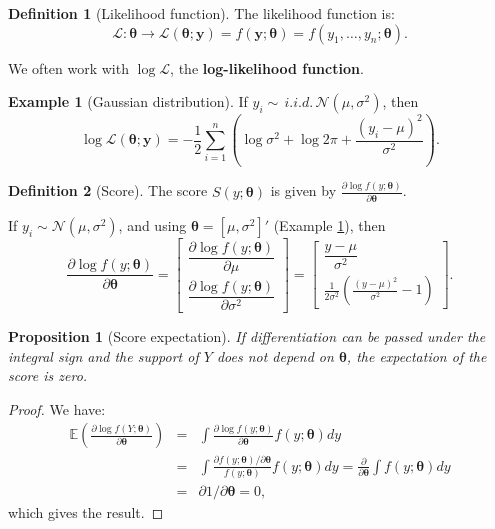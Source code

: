\documentclass[
  11pt,
]{book}
\newtheorem{proposition}{Proposition}[chapter]
\theoremstyle{definition}
\newtheorem{definition}{Definition}[chapter]
\theoremstyle{definition}
\newtheorem{example}{Example}[chapter]
\theoremstyle{definition}
\theoremstyle{definition}
\theoremstyle{remark}
\begin{document}
\begin{definition}[Likelihood function]
\protect\hypertarget{def:likelihood}{}\label{def:likelihood}The likelihood function is:
\[
\mathcal{L}: \boldsymbol\theta \rightarrow  \mathcal{L}(\boldsymbol\theta;\mathbf{y})=f(\mathbf{y};\boldsymbol\theta)=f(y_1,\dots,y_n;\boldsymbol\theta).
\]
\end{definition}

We often work with \(\log \mathcal{L}\), the \textbf{log-likelihood function}.

\begin{example}[Gaussian distribution]
\protect\hypertarget{exm:normal}{}\label{exm:normal}If \(y_i \sim \,i.i.d.\, \mathcal{N}(\mu,\sigma^2)\), then
\[
\log \mathcal{L}(\boldsymbol\theta;\mathbf{y}) = - \frac{1}{2}\sum_{i=1}^n\left( \log \sigma^2 + \log 2\pi + \frac{(y_i-\mu)^2}{\sigma^2} \right).
\]
\end{example}

\begin{definition}[Score]
\protect\hypertarget{def:score}{}\label{def:score}The score \(S(y;\boldsymbol\theta)\) is given by \(\frac{\partial \log f(y;\boldsymbol\theta)}{\partial \boldsymbol\theta}\).
\end{definition}

If \(y_i \sim \mathcal{N}(\mu,\sigma^2)\), and using \(\boldsymbol\theta=[\mu,\sigma^2]'\) (Example \ref{exm:normal}), then
\[
\frac{\partial \log f(y;\boldsymbol\theta)}{\partial \boldsymbol\theta} =
\left[\begin{array}{c}
\dfrac{\partial \log f(y;\boldsymbol\theta)}{\partial \mu}\\
\dfrac{\partial \log f(y;\boldsymbol\theta)}{\partial \sigma^2}
\end{array}\right] =
\left[\begin{array}{c}
\dfrac{y-\mu}{\sigma^2}\\
\frac{1}{2\sigma^2}\left(\frac{(y-\mu)^2}{\sigma^2}-1\right)
\end{array}\right].
\]

\begin{proposition}[Score expectation]
\protect\hypertarget{prp:score-expectation}{}\label{prp:score-expectation}If differentiation can be passed under the integral sign and the support of \(Y\) does not depend on \(\boldsymbol\theta\), the expectation of the score is zero.
\end{proposition}

\begin{proof}
We have:
\begin{eqnarray*}
\mathbb{E}\left(\frac{\partial \log f(Y;\boldsymbol\theta)}{\partial \boldsymbol\theta}\right) &=&
\int \frac{\partial \log f(y;\boldsymbol\theta)}{\partial \boldsymbol\theta} f(y;\boldsymbol\theta) dy \\
&=& \int \frac{\partial f(y;\boldsymbol\theta)/\partial \boldsymbol\theta}{f(y;\boldsymbol\theta)} f(y;\boldsymbol\theta) dy =
\frac{\partial}{\partial \boldsymbol\theta} \int f(y;\boldsymbol\theta) dy\\
&=&\partial 1 /\partial \boldsymbol\theta = 0,
\end{eqnarray*}
which gives the result.
\end{proof}
\end{document}
